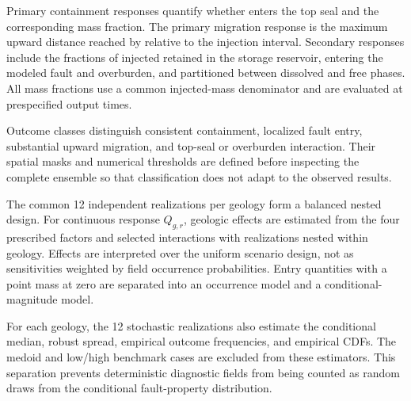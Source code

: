
\label{sec:si-migration-containment-uq}


Primary containment responses quantify whether \coTwo{} enters the top seal
and the corresponding mass fraction. The primary migration response is the
maximum upward distance reached by \coTwo{} relative to the injection
interval. Secondary responses include the fractions of injected \coTwo{}
retained in the storage reservoir, entering the modeled fault and overburden,
and partitioned between dissolved and free phases. All mass fractions use a
common injected-mass denominator and are evaluated at prespecified output
times.

Outcome classes distinguish consistent containment, localized fault entry,
substantial upward migration, and top-seal or overburden interaction. Their
spatial masks and numerical thresholds are defined before inspecting the
complete ensemble so that classification does not adapt to the observed
results. 


The common 12 independent realizations per geology form a balanced nested
design. For continuous response $Q_{g,r}$, geologic effects are estimated from
the four prescribed factors and selected interactions with realizations nested
within geology. Effects are interpreted over the uniform scenario design, not
as sensitivities weighted by field occurrence probabilities. Entry quantities
with a point mass at zero are separated into an occurrence model and a
conditional-magnitude model. 

For each geology, the 12 stochastic realizations also estimate the conditional
median, robust spread, empirical outcome frequencies, and empirical CDFs. The
medoid and low/high benchmark cases are excluded from these estimators. This
separation prevents deterministic diagnostic fields from being counted as
random draws from the conditional fault-property distribution.

